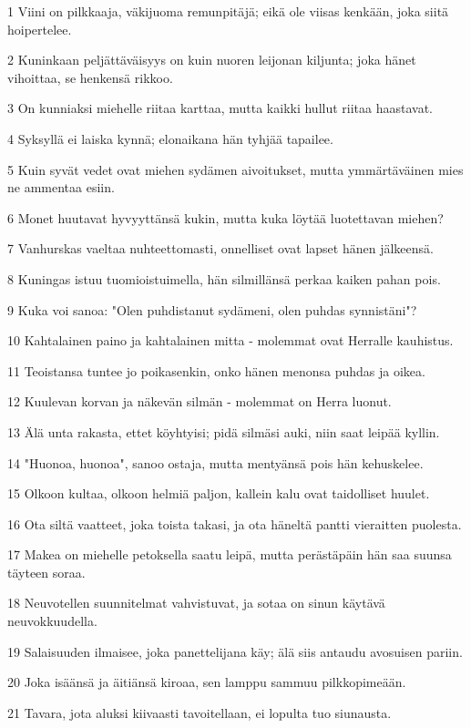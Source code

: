 \par 1 Viini on pilkkaaja, väkijuoma remunpitäjä; eikä ole viisas kenkään, joka siitä hoipertelee.
\par 2 Kuninkaan peljättäväisyys on kuin nuoren leijonan kiljunta; joka hänet vihoittaa, se henkensä rikkoo.
\par 3 On kunniaksi miehelle riitaa karttaa, mutta kaikki hullut riitaa haastavat.
\par 4 Syksyllä ei laiska kynnä; elonaikana hän tyhjää tapailee.
\par 5 Kuin syvät vedet ovat miehen sydämen aivoitukset, mutta ymmärtäväinen mies ne ammentaa esiin.
\par 6 Monet huutavat hyvyyttänsä kukin, mutta kuka löytää luotettavan miehen?
\par 7 Vanhurskas vaeltaa nuhteettomasti, onnelliset ovat lapset hänen jälkeensä.
\par 8 Kuningas istuu tuomioistuimella, hän silmillänsä perkaa kaiken pahan pois.
\par 9 Kuka voi sanoa: "Olen puhdistanut sydämeni, olen puhdas synnistäni"?
\par 10 Kahtalainen paino ja kahtalainen mitta - molemmat ovat Herralle kauhistus.
\par 11 Teoistansa tuntee jo poikasenkin, onko hänen menonsa puhdas ja oikea.
\par 12 Kuulevan korvan ja näkevän silmän - molemmat on Herra luonut.
\par 13 Älä unta rakasta, ettet köyhtyisi; pidä silmäsi auki, niin saat leipää kyllin.
\par 14 "Huonoa, huonoa", sanoo ostaja, mutta mentyänsä pois hän kehuskelee.
\par 15 Olkoon kultaa, olkoon helmiä paljon, kallein kalu ovat taidolliset huulet.
\par 16 Ota siltä vaatteet, joka toista takasi, ja ota häneltä pantti vieraitten puolesta.
\par 17 Makea on miehelle petoksella saatu leipä, mutta perästäpäin hän saa suunsa täyteen soraa.
\par 18 Neuvotellen suunnitelmat vahvistuvat, ja sotaa on sinun käytävä neuvokkuudella.
\par 19 Salaisuuden ilmaisee, joka panettelijana käy; älä siis antaudu avosuisen pariin.
\par 20 Joka isäänsä ja äitiänsä kiroaa, sen lamppu sammuu pilkkopimeään.
\par 21 Tavara, jota aluksi kiivaasti tavoitellaan, ei lopulta tuo siunausta.
